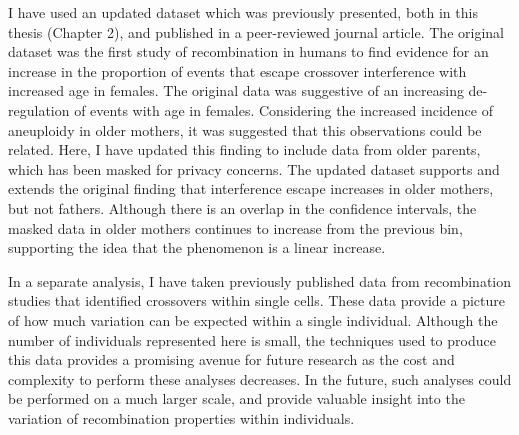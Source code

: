 I have used an updated dataset which was previously presented, both in this thesis (Chapter 2), and published in a peer-reviewed journal article\cite{Campbell2015}.
The original dataset was the first study of recombination in humans to find evidence for an increase in the proportion of events that escape crossover interference with increased age in females.
The original data was suggestive of an increasing de-regulation of events with age in females.
Considering the increased incidence of aneuploidy in older mothers\cite{Hassold2001}, it was suggested that this observations could be related.
Here, I have updated this finding to include data from older parents, which has been masked for privacy concerns.
The updated dataset supports and extends the original finding that interference escape increases in older mothers, but not fathers.
Although there is an overlap in the confidence intervals, the masked data in older mothers continues to increase from the previous bin, supporting the idea that the phenomenon is a linear increase.

In a separate analysis, I have taken previously published data from recombination studies that identified crossovers within single cells.
These data provide a picture of how much variation can be expected within a single individual.
Although the number of individuals represented here is small, the techniques used to produce this data provides a promising avenue for future research as the cost and complexity to perform these analyses decreases.
In the future, such analyses could be performed on a much larger scale, and provide valuable insight into the variation of recombination properties within individuals.

\clearpage
\renewcommand{\bibname}{References}
\begingroup
    \setlength{\bibsep}{10pt}
    \linespread{1}\selectfont
    
\endgroup



